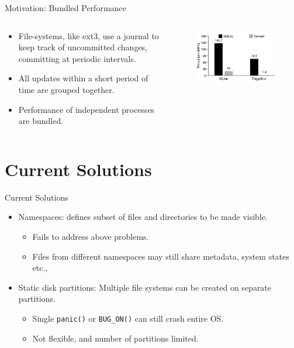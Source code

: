 \documentclass[aspectratio=169]{beamer}
\newcommand{\bi}{\begin{itemize}}
\newcommand{\ei}{\end{itemize}}
\begin{document}
\begin{frame}{Motivation: Bundled Performance}
    \begin{columns}[T]
        \begin{column}{0.4\textwidth}
            \bi
        \item File-systems, like ext3, use a journal to keep track of uncommitted changes,
            committing at periodic intervals.
        \item All updates within a short period of time are grouped together.
        \item Performance of independent processes are bundled.
            \ei
    \end{column}
    \begin{column}{0.2\textwidth}
        \pause
        \begin{figure}
            \includegraphics[scale=0.3]{./figures/fig2.png}
        \end{figure}
    \end{column}
\end{columns}
\end{frame}

\section{Current Solutions}
\begin{frame}{Current Solutions}
    \bi
\item Namespaces: defines subset of files and directories to be made visible.
    \pause
    \bi
\item Fails to address above problems.
\item Files from different namespaces may still share metadata, system states
    etc.,
    \ei
\item Static disk partitions: Multiple file systems can be created on separate
    partitions.
    \pause
    \bi
\item Single \texttt{panic()} or \texttt{BUG\_ON()} can still crash entire OS.
\item Not flexible, and number of partitions limited.
    \ei
    \ei
\end{frame}
\end{document}
